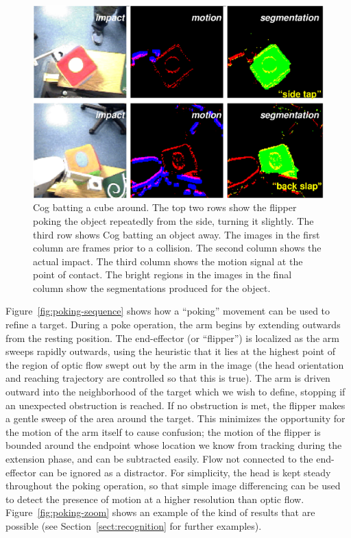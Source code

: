 \ifverbose
%
\begin{figure}[tb]
\begin{center}
\includegraphics[width=12cm]{segmentation-detail.eps}
\caption{ 
\label{fig:poking-segmentation}
%
Cog batting a cube around.  The top two rows show the flipper poking
the object repeatedly from the side, turning it slightly.  The third
row shows Cog batting an object away.  The images in the first column
are frames prior to a collision.  The second column shows the actual
impact.  The third column shows the motion signal at the point of
contact.  The bright regions in the images in the final column show
the segmentations produced for the object. 
%
}
\end{center}
\end{figure}
%
\fi

Figure~\ref{fig:poking-sequence} shows how a ``poking'' movement can
be used to refine a target.  During a poke operation, the arm begins
by extending outwards from the resting position.  The end-effector (or
``flipper'') is localized as the arm sweeps rapidly outwards, using
the heuristic that it lies at the highest point of the region of optic
flow swept out by the arm in the image (the head orientation and
reaching trajectory are controlled so that this is true).  The arm is
driven outward into the neighborhood of the target which we wish to
define, stopping if an unexpected obstruction is reached.  If no
obstruction is met, the flipper makes a gentle sweep of the area
around the target.  This minimizes the opportunity for the motion of
the arm itself to cause confusion; the motion of the flipper is
bounded around the endpoint whose location we know from tracking
during the extension phase, and can be subtracted easily.  Flow not
connected to the end-effector can be ignored as a distractor.  
For simplicity, the head is kept steady throughout the poking
operation, so that simple image differencing can be used to detect
the presence of motion at a higher resolution than optic flow.
Figure~\ref{fig:poking-zoom} shows an example of the kind of 
results that are possible (see Section~\ref{sect:recognition} for 
further examples).

